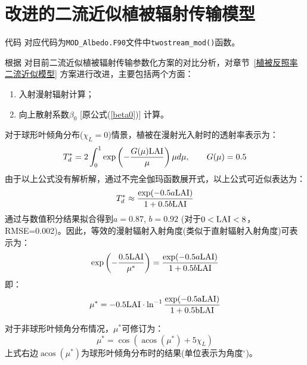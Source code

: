 \section{改进的二流近似植被辐射传输模型}\label{sec:改进的二流近似植被辐射传输模型}
\begin{mymdframed}{代码}
对应代码为\texttt{MOD\_Albedo.F90}文件中\texttt{twostream\_mod()}函数。
\end{mymdframed}

根据 \citet{yuan2017reexamination} 对目前二流近似植被辐射传输参数化方案的对比分析，对章节~\ref{植被反照率二流近似模型} 方案进行改进，主要包括两个方面：
\begin{enumerate}
    \item 入射漫射辐射计算；
    \item 向上散射系数$\beta_0$ [原公式(\ref{beta0})] 计算。
\end{enumerate}

对于球形叶倾角分布($\chi_L=0$)情景，植被在漫射光入射时的透射率表示为：
\begin{equation}
T_{d}^{*}=2 \int_{0}^{1} \exp \left(-\frac{G(\mu) \rm LAI}{\mu}\right) \mu d \mu, \qquad G(\mu)=0.5
\end{equation}
由于以上公式没有解析解，通过不完全伽玛函数展开式，以上公式可近似表达为：
\begin{equation}
T_{d}^{*} \approx \frac{\exp (-0.5 a \rm LAI)}{1+0.5 b \rm LAI}
\end{equation}
通过与数值积分结果拟合得到$a=0.87$, $b=0.92$ (对于$0<\rm LAI<8$，RMSE=0.002)。因此，等效的漫射辐射入射角度(类似于直射辐射入射角度)可表示为：
\begin{equation}
\exp \left(-\frac{0.5 \rm LAI}{\mu^{*}}\right)=\frac{\exp (-0.5 a \rm LAI)}{1+0.5 b \rm LAI}
\end{equation}
即：
\begin{equation}
\mu^{*}=-0.5 \rm LAI \cdot \ln ^{-1} \frac{\exp (-0.5 a \rm LAI)}{1+0.5 b \rm LAI}
\end{equation}

对于非球形叶倾角分布情况，$\mu^\ast$可修订为：
\begin{equation}
\mu^{*}=\cos \left(\operatorname{acos}\left(\mu^{*}\right)+5 \chi_{L}\right)
\end{equation}
上式右边$\operatorname{acos}\left(\mu^{*}\right)$为球形叶倾角分布时的结果(单位表示为角度$^{\circ}$)。


